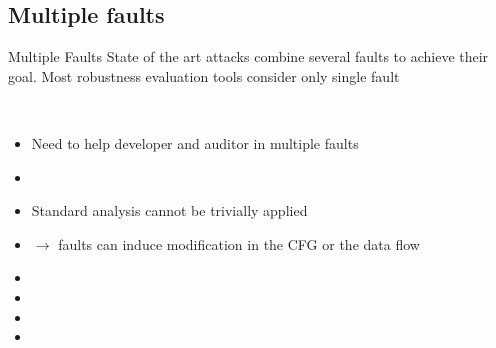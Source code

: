 \subsection{Multiple faults}

\begin{frame}[fragile]{Multiple Faults}
\vfill
    State of the art attacks combine several faults to achieve their goal. %
    \vspace{0.2cm}
    Most robustness evaluation tools consider only single fault
    
    {\small    
        \vspace{0.3cm}
        \
        \begin{itemize}
            \item Need to help developer and auditor in multiple faults
            \item []
            \item Standard analysis cannot be trivially applied
            \item[] $\rightarrow$ faults can induce modification in the CFG or the data flow
            \item []
            \item {}
            \item []
            \item []
        \end{itemize}
        
    }
\end{frame}



